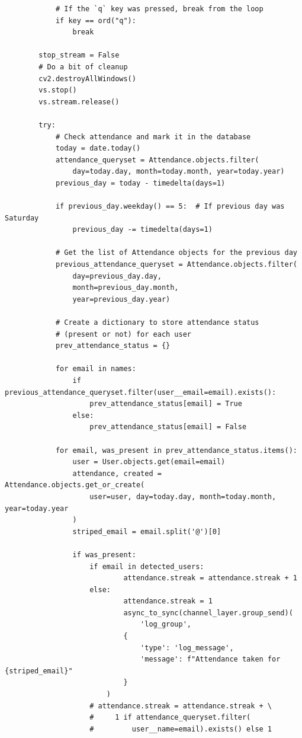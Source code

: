 \begin{itemize}
\begin{verbatim}
            # If the `q` key was pressed, break from the loop
            if key == ord("q"):
                break

        stop_stream = False
        # Do a bit of cleanup
        cv2.destroyAllWindows()
        vs.stop()
        vs.stream.release()

        try:
            # Check attendance and mark it in the database
            today = date.today()
            attendance_queryset = Attendance.objects.filter(
                day=today.day, month=today.month, year=today.year)
            previous_day = today - timedelta(days=1)

            if previous_day.weekday() == 5:  # If previous day was Saturday
                previous_day -= timedelta(days=1)

            # Get the list of Attendance objects for the previous day
            previous_attendance_queryset = Attendance.objects.filter(
                day=previous_day.day, 
                month=previous_day.month, 
                year=previous_day.year)

            # Create a dictionary to store attendance status 
            # (present or not) for each user
            prev_attendance_status = {}

            for email in names:
                if previous_attendance_queryset.filter(user__email=email).exists():
                    prev_attendance_status[email] = True
                else:
                    prev_attendance_status[email] = False

            for email, was_present in prev_attendance_status.items():
                user = User.objects.get(email=email)
                attendance, created = Attendance.objects.get_or_create(
                    user=user, day=today.day, month=today.month, year=today.year
                )
                striped_email = email.split('@')[0]

                if was_present:
                    if email in detected_users:
                            attendance.streak = attendance.streak + 1
                    else:
                            attendance.streak = 1
                            async_to_sync(channel_layer.group_send)(
                                'log_group',
                            {
                                'type': 'log_message',
                                'message': f"Attendance taken for {striped_email}"
                            }
                        )
                    # attendance.streak = attendance.streak + \
                    #     1 if attendance_queryset.filter(
                    #         user__name=email).exists() else 1
          

\end{verbatim}
\end{itemize}
